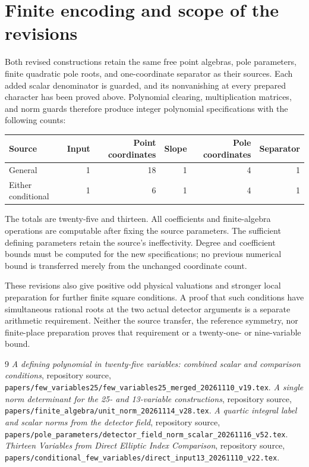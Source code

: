 \documentclass[11pt,a4paper]{article}
\begin{document}
\section{Finite encoding and scope of the revisions}

Both revised constructions retain the same free point algebras, pole
parameters, finite quadratic pole roots, and one-coordinate separator
as their sources. Each added scalar denominator is guarded, and its
nonvanishing at every prepared character has been proved above.
Polynomial clearing, multiplication matrices, and norm guards therefore
produce integer polynomial specifications with the following counts:
\begin{center}
\begin{tabular}{lrrrrr}\toprule
Source&Input&Point coordinates&Slope&Pole coordinates&Separator\\\midrule
General&1&18&1&4&1\\
Either conditional&1&6&1&4&1\\\bottomrule
\end{tabular}
\end{center}
The totals are twenty-five and thirteen. All coefficients and
finite-algebra operations are computable after fixing the source
parameters. The sufficient defining parameters retain the source's
ineffectivity. Degree and coefficient bounds must be computed for the
new specifications; no previous numerical bound is transferred merely
from the unchanged coordinate count.

These revisions also give positive odd physical valuations and stronger
local preparation for further finite square conditions. A proof that
such conditions have simultaneous rational roots at the two actual
detector arguments is a separate arithmetic requirement. Neither the
source transfer, the reference symmetry, nor finite-place preparation
proves that requirement or a twenty-one- or nine-variable bound.

\begin{thebibliography}{9}
\emph{A defining polynomial in twenty-five variables: combined scalar
and comparison conditions}, repository source,
\nolinkurl{papers/few_variables25/few_variables25_merged_20261110_v19.tex}.
\emph{A single norm determinant for the 25- and 13-variable constructions},
repository source,
\nolinkurl{papers/finite_algebra/unit_norm_20261114_v28.tex}.
\emph{A quartic integral label and scalar norms from the detector field},
repository source,
\nolinkurl{papers/pole_parameters/detector_field_norm_scalar_20261116_v52.tex}.
\emph{Thirteen Variables from Direct Elliptic Index Comparison},
repository source,
\nolinkurl{papers/conditional_few_variables/direct_input13_20261110_v22.tex}.
\end{thebibliography}
\end{document}
